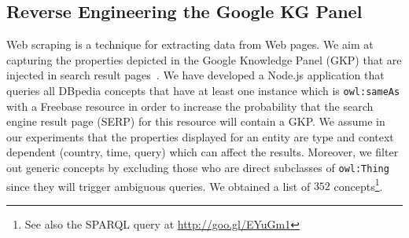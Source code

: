 
\subsection{Reverse Engineering the Google KG Panel}
\label{sec:knowledge-graph}
Web scraping is a technique for extracting data from Web pages. We aim at capturing the properties depicted in the Google Knowledge Panel (GKP) that are injected in search result pages~\cite{Bergman2012}. We have developed a Node.js application that queries all DBpedia concepts that have at least one instance which is \texttt{owl:sameAs} with a Freebase resource in order to increase the probability that the search engine result page (SERP) for this resource will contain a GKP. We assume in our experiments that the properties displayed for an entity are type and context dependent (country, time, query) which can affect the results. Moreover, we filter out generic concepts by excluding those who are direct subclasses of \texttt{owl:Thing} since they will trigger ambiguous queries. We obtained a list of $352$ concepts\footnote{See also the SPARQL query at \url{http://goo.gl/EYuGm1}}.


